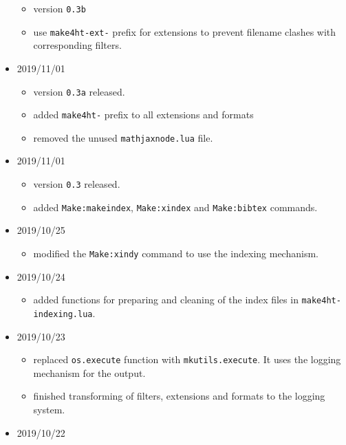 \begin{itemize}
  \begin{itemize}
  \tightlist
  \item
    version \texttt{0.3b}
  \item
    use \texttt{make4ht-ext-} prefix for extensions to prevent filename
    clashes with corresponding filters.
  \end{itemize}
\item
  2019/11/01

  \begin{itemize}
  \tightlist
  \item
    version \texttt{0.3a} released.
  \item
    added \texttt{make4ht-} prefix to all extensions and formats
  \item
    removed the unused \texttt{mathjaxnode.lua} file.
  \end{itemize}
\item
  2019/11/01

  \begin{itemize}
  \tightlist
  \item
    version \texttt{0.3} released.
  \item
    added \texttt{Make:makeindex}, \texttt{Make:xindex} and
    \texttt{Make:bibtex} commands.
  \end{itemize}
\item
  2019/10/25

  \begin{itemize}
  \tightlist
  \item
    modified the \texttt{Make:xindy} command to use the indexing
    mechanism.
  \end{itemize}
\item
  2019/10/24

  \begin{itemize}
  \tightlist
  \item
    added functions for preparing and cleaning of the index files in
    \texttt{make4ht-indexing.lua}.
  \end{itemize}
\item
  2019/10/23

  \begin{itemize}
  \tightlist
  \item
    replaced \texttt{os.execute} function with \texttt{mkutils.execute}.
    It uses the logging mechanism for the output.
  \item
    finished transforming of filters, extensions and formats to the
    logging system.
  \end{itemize}
\item
  2019/10/22


\end{itemize}
